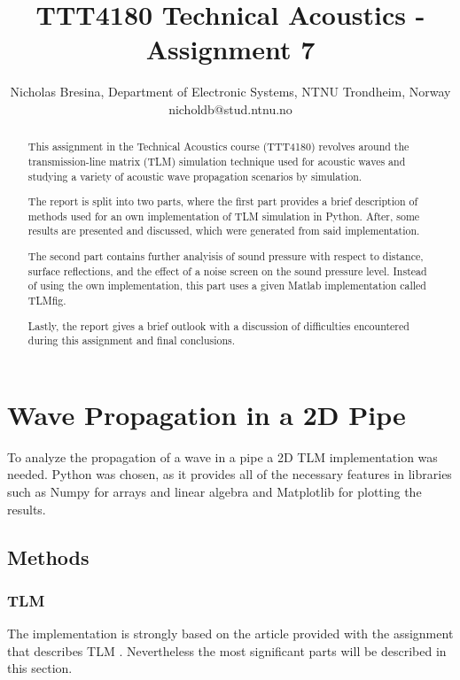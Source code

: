 \documentclass[twocolumn]{article}
\begin{document}
\title{TTT4180 Technical Acoustics - Assignment 7}

\author{Nicholas Bresina, Department of Electronic Systems, NTNU Trondheim, Norway \\
nicholdb@stud.ntnu.no}

\maketitle\thispagestyle{empty}

\begin{abstract}
This assignment in the Technical Acoustics course (TTT4180) revolves around
the transmission-line matrix (TLM) simulation technique used for acoustic waves
and studying a variety of acoustic wave propagation scenarios by simulation.

The report is split into two parts, where the first part provides a brief
description of methods used for an own implementation of TLM simulation in Python.
After, some results are presented and discussed, which were generated from said
implementation.

The second part contains further analyisis of sound pressure
with respect to distance, surface reflections, and the effect of a noise screen
on the sound pressure level.
Instead of using the own implementation, this part uses a given Matlab implementation
called TLMfig.

Lastly, the report gives a brief outlook with a discussion of difficulties
encountered during this assignment and final conclusions.
\end{abstract}


\section{Wave Propagation in a 2D Pipe}
To analyze the propagation of a wave in a pipe a 2D TLM implementation was needed.
Python was chosen, as it provides all of the necessary features in libraries such
as Numpy \cite{NumpyManual} for arrays and linear algebra and Matplotlib \cite{Matplotlib}
for plotting the results.

\subsection{Methods}
\subsubsection{TLM}
The implementation is strongly based on the article provided with the assignment
that describes TLM \cite{KagawaTLM}.
Nevertheless the most significant parts will be described in this section.
\end{document}
